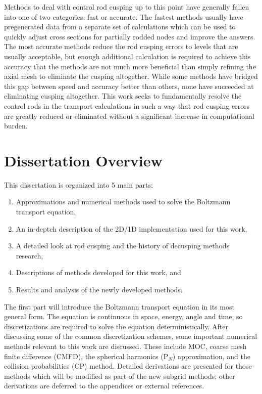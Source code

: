 Methods to deal with control rod cusping up to this point have generally fallen into one of two categories: fast or accurate.  The fastest methods usually have pregenerated data from a separate set of calculations which can be used to quickly adjust cross sections for partially rodded nodes and improve the answers.  The most accurate methods reduce the rod cusping errors to levels that are usually acceptable, but enough additional calculation is required to achieve this accuracy that the methods are not much more beneficial than simply refining the axial mesh to eliminate the cusping altogether.  While some methods have bridged this gap between speed and accuracy better than others, none have succeeded at eliminating cusping altogether.  This work seeks to fundamentally resolve the control rods in the transport calculations in such a way that rod cusping errors are greatly reduced or eliminated without a significant increase in computational burden.

\section{Dissertation Overview}

This dissertation is organized into 5 main parts:

\begin{enumerate}
    \item Approximations and numerical methods used to solve the Boltzmann transport equation,
    \item An in-deptch description of the 2D/1D implementation used for this work,
    \item A detailed look at rod cusping and the history of decusping methods research,
    \item Descriptions of methods developed for this work, and
    \item Results and analysis of the newly developed methods.
\end{enumerate}

The first part will introduce the Boltzmann transport equation in its most general form.  The equation is continuous in space, energy, angle and time, so discretizations are required to solve the equation deterministically.  After discussing some of the common discretization schemes, some important numerical methods relevant to this work are discussed.  These include MOC, coarse mesh finite difference (CMFD), the spherical harmonics (P$_N$) approximation, and the collision probabilities (CP) method.  Detailed derivations are presented for those methods which will be modified as part of the new subgrid methods; other derivations are deferred to the appendices or external references.

